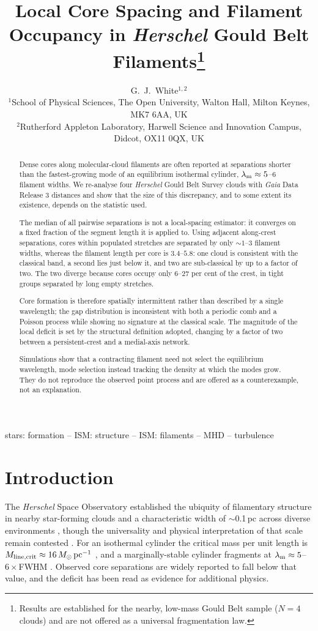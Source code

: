 \documentclass[usenatbib,twoside,twocolumn]{mnras}
\title[Core spacing and filament occupancy in HGBS filaments]{Local Core Spacing and Filament Occupancy in \textit{Herschel} Gould Belt Filaments\thanks{Results are established for the nearby, low-mass Gould Belt sample ($N=4$ clouds) and are not offered as a universal fragmentation law.}}
\author[G.~J.~White]{G.~J.~White$^{1,2}$\\
$^{1}$School of Physical Sciences, The Open University, Walton Hall, Milton Keynes, MK7 6AA, UK\\
$^{2}$Rutherford Appleton Laboratory, Harwell Science and Innovation Campus, Didcot, OX11 0QX, UK}
\begin{document}
\maketitle

\begin{abstract}
Dense cores along molecular-cloud filaments are often reported at separations shorter than the fastest-growing mode of an equilibrium isothermal cylinder, $\lambda_{\rm m}\approx5$--$6$ filament widths. We re-analyse four \textit{Herschel} Gould Belt Survey clouds with \textit{Gaia} Data Release 3 distances and show that the size of this discrepancy, and to some extent its existence, depends on the statistic used.

The median of all pairwise separations is not a local-spacing estimator: it converges on a fixed fraction of the segment length it is applied to. Using adjacent along-crest separations, cores within populated stretches are separated by only $\sim1$--$3$ filament widths, whereas the filament length per core is $3.4$--$5.8$: one cloud is consistent with the classical band, a second lies just below it, and two are sub-classical by up to a factor of two. The two diverge because cores occupy only $6$--$27$ per cent of the crest, in tight groups separated by long empty stretches.

Core formation is therefore spatially intermittent rather than described by a single wavelength; the gap distribution is inconsistent with both a periodic comb and a Poisson process while showing no signature at the classical scale. The magnitude of the local deficit is set by the structural definition adopted, changing by a factor of two between a persistent-crest and a medial-axis network.

Simulations show that a contracting filament need not select the equilibrium wavelength, mode selection instead tracking the density at which the modes grow. They do not reproduce the observed point process and are offered as a counterexample, not an explanation.
\end{abstract}

\begin{keywords}
stars: formation -- ISM: structure -- ISM: filaments -- MHD -- turbulence
\end{keywords}

\section{Introduction}

The \textit{Herschel} Space Observatory established the ubiquity of filamentary structure in nearby star-forming clouds \citep{Andre2010} and a characteristic width of $\sim$0.1\,pc across diverse environments \citep{Arzoumanian2011}, though the universality and physical interpretation of that scale remain contested \citep{Panopoulou2017,Panopoulou2022}. For an isothermal cylinder the critical mass per unit length is $M_{\rm line,crit}\approx16\,M_\odot\,{\rm pc^{-1}}$ \citep{Ostriker1964}, and a marginally-stable cylinder fragments at $\lambda_{\rm m}\approx5$--$6\times$FWHM \citep{Inutsuka1992,Fischera2012}. Observed core separations are widely reported to fall below that value, and the deficit has been read as evidence for additional physics.
\end{document}
